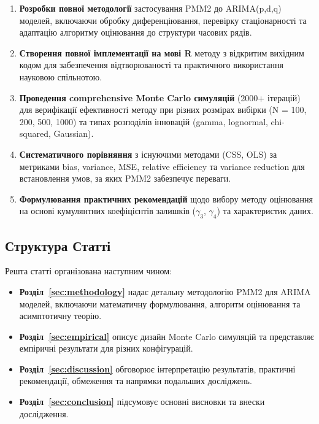 \documentclass[12pt,a4paper]{article}
\begin{document}
\begin{enumerate}
    \item \textbf{Розробки повної методології} застосування PMM2 до ARIMA(p,d,q) моделей, включаючи обробку диференціювання, перевірку стаціонарності та адаптацію алгоритму оцінювання до структури часових рядів.

    \item \textbf{Створення повної імплементації на мові R} методу з відкритим вихідним кодом для забезпечення відтворюваності та практичного використання науковою спільнотою.

    \item \textbf{Проведення comprehensive Monte Carlo симуляцій} (2000+ ітерацій) для верифікації ефективності методу при різних розмірах вибірки (N = 100, 200, 500, 1000) та типах розподілів інновацій (gamma, lognormal, chi-squared, Gaussian).

    \item \textbf{Систематичного порівняння} з існуючими методами (CSS, OLS) за метриками bias, variance, MSE, relative efficiency та variance reduction для встановлення умов, за яких PMM2 забезпечує переваги.

    \item \textbf{Формулювання практичних рекомендацій} щодо вибору методу оцінювання на основі кумулянтних коефіцієнтів залишків ($\gamma_3$, $\gamma_4$) та характеристик даних.
\end{enumerate}

\subsection{Структура Статті}
\label{subsec:structure}

Решта статті організована наступним чином:

\begin{itemize}
    \item \textbf{Розділ~\ref{sec:methodology}} надає детальну методологію PMM2 для ARIMA моделей, включаючи математичну формулювання, алгоритм оцінювання та асимптотичну теорію.

    \item \textbf{Розділ~\ref{sec:empirical}} описує дизайн Monte Carlo симуляцій та представляє емпіричні результати для різних конфігурацій.

    \item \textbf{Розділ~\ref{sec:discussion}} обговорює інтерпретацію результатів, практичні рекомендації, обмеження та напрямки подальших досліджень.

    \item \textbf{Розділ~\ref{sec:conclusion}} підсумовує основні висновки та внески дослідження.
\end{itemize}
\end{document}
